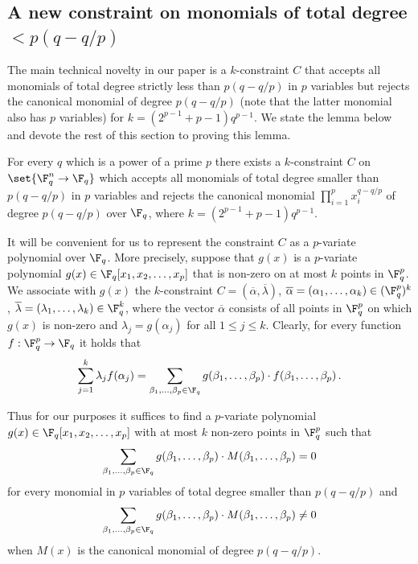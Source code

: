 \subsection{A new constraint on monomials of total degree
  \texorpdfstring{$< p(q - q/p)$}{< p(p - q/p)}}\label{sec:main-lemma}

The main technical novelty in our paper is a $k$-constraint $C$ 
that accepts all monomials of total degree strictly less than
$p(q-q/p)$ in $p$ variables but rejects the canonical monomial of degree $p(q-q/p)$
(note that the latter monomial also has $p$ variables) for
$k= (2^{p-1}+p-1)q^{p-1}$. We state the lemma below and devote the
rest of this section to proving this lemma.

\begin{lemma}\label{lem:main-technical}
For every $q$ which is a power of a prime $p$ there exists a
$k$-constraint $C$ on $\set{\F_q^n \to \F_q}$ which accepts all monomials of total degree smaller than $p(q-q/p)$ in $p$
variables and rejects the canonical monomial $\prod_{i=1}^{p} x_i^{q-q/p}$
of degree $p(q-q/p)$  over $\F_q$, where $k = (2^{p-1}+p-1)q^{p-1}$.
\end{lemma}


It will be convenient for us to represent the constraint $C$ as a $p$-variate polynomial over $\F_q$. More precisely, suppose that
 $g(x)$ is a $p$-variate polynomial $g(x) \in \F_q [x_1,x_2,\ldots,x_p]$ that is non-zero on at most $k$ points in $\F_q^p$.
We associate with $g(x)$ the $k$-constraint $C=(\overline \alpha, \overline \lambda)$,
$\overline \alpha = (\alpha_1,\ldots,\alpha_k) \in (\F_q^p)^k$,  $\overline \lambda = (\lambda_1,\ldots,\lambda_k) \in \F_q^k$, where the vector $\overline \alpha$ consists
of all points  in $\F_q^p$ on which $g(x)$ is non-zero and $\lambda_j = g(\alpha_j)$ for all $ 1 \leq j \leq k$. Clearly, for every function
$f: \F_q^p \to \F_q$ it holds that
\begin{equation*}
\sum_{j=1}^k \lambda_j f(\alpha_j) = \sum_{\beta_1, \ldots, \beta_p \in \F_q} g(\beta_1, \ldots, \beta_p) \cdot f(\beta_1, \ldots, \beta_p)\,.
\end{equation*}

Thus for our purposes it suffices to find
%
%
a $p$-variate polynomial  $g(x) \in \F_{q} [x_1,x_2,\ldots,x_p]$
 with at most $k$ non-zero points in $\F_q^p$ such that $$ \sum_{\beta_1,\ldots,\beta_p \in \F_q} g(\beta_1,\ldots,\beta_p) \cdot M(\beta_1,\ldots,\beta_p) = 0$$ for
 every monomial in $p$ variables of total degree smaller than $p(q-q/p)$ and
 $$ \sum_{\beta_1,\ldots,\beta_p \in \F_q} g(\beta_1,\ldots,\beta_p) \cdot M(\beta_1,\ldots,\beta_p) \neq 0$$ when $M(x)$ is the canonical monomial of degree $p(q-q/p)$.


